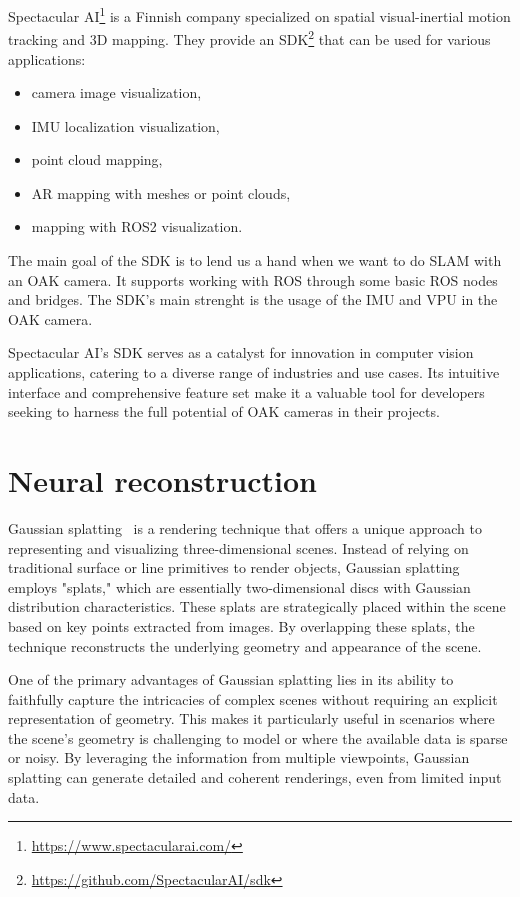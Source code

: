 Spectacular AI\footnote{\url{https://www.spectacularai.com/}} is a Finnish company specialized on spatial visual-inertial motion tracking and 3D mapping. They provide an SDK\footnote{\url{https://github.com/SpectacularAI/sdk}} that can be used for various applications:
\FloatBarrier
\begin{itemize}
\setlength\itemsep{0em}
    \item camera image visualization,
    \item IMU localization visualization,
    \item point cloud mapping,
    \item AR mapping with meshes or point clouds,
    \item mapping with ROS2 visualization.
\end{itemize}
\FloatBarrier
The main goal of the SDK is to lend us a hand when we want to do SLAM with an OAK camera. It supports working with ROS through some basic ROS nodes and bridges. The SDK's main strenght is the usage of the IMU and VPU in the OAK camera.

Spectacular AI's SDK serves as a catalyst for innovation in computer vision applications, catering to a diverse range of industries and use cases. Its intuitive interface and comprehensive feature set make it a valuable tool for developers seeking to harness the full potential of OAK cameras in their projects.

\section{Neural reconstruction}

Gaussian splatting~\cite{3DGS} is a rendering technique that offers a unique approach to representing and visualizing three-dimensional scenes. Instead of relying on traditional surface or line primitives to render objects, Gaussian splatting employs "splats," which are essentially two-dimensional discs with Gaussian distribution characteristics. These splats are strategically placed within the scene based on key points extracted from images. By overlapping these splats, the technique reconstructs the underlying geometry and appearance of the scene.

One of the primary advantages of Gaussian splatting lies in its ability to faithfully capture the intricacies of complex scenes without requiring an explicit representation of geometry. This makes it particularly useful in scenarios where the scene's geometry is challenging to model or where the available data is sparse or noisy. By leveraging the information from multiple viewpoints, Gaussian splatting can generate detailed and coherent renderings, even from limited input data.

